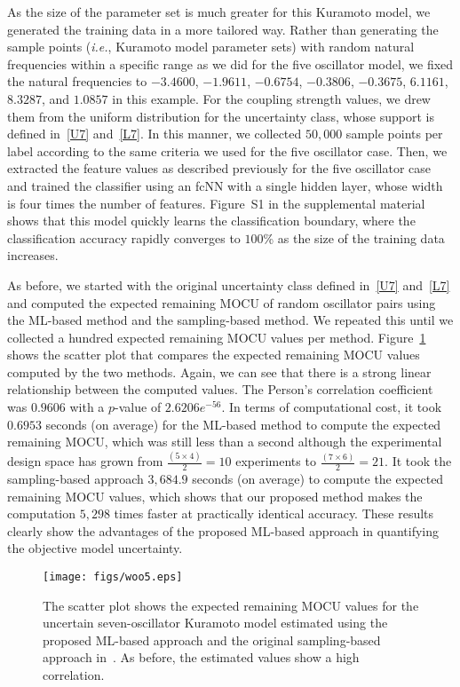 \documentclass{article}
\begin{document}
As the size of the parameter set is much greater for this Kuramoto model, we generated the training data in a more tailored way. Rather than generating the sample points (\textit{i.e.}, Kuramoto model parameter sets) with random natural frequencies within a specific range as we did for the five oscillator model, we fixed the natural frequencies to $-3.4600$, $-1.9611$, $-0.6754$, $-0.3806$, $-0.3675$, $6.1161$, $8.3287$, and ${1.0857}$ in this example. For the coupling strength values, we drew them from the uniform distribution for the uncertainty class, whose support is defined in~\eqref{U7} and~\eqref{L7}. In this manner, we collected $50,000$ sample points per label according to the same criteria we used for the five oscillator case. Then, we extracted the feature values as described previously for the five oscillator case and trained the classifier using an fcNN with a single hidden layer, whose width is four times the number of features. Figure~S1 in the supplemental material shows that this model quickly learns the classification boundary, where the classification accuracy rapidly converges to $100$\% as the size of the training data increases.

As before, we started with the original uncertainty class defined in~\eqref{U7} and~\eqref{L7} and computed the expected remaining MOCU of random oscillator pairs using the ML-based method and the sampling-based method. We repeated this until we collected a hundred expected remaining MOCU values per method. Figure~\ref{fig5} shows the scatter plot that compares the expected remaining MOCU values computed by the two methods. Again, we can see that there is a strong linear relationship between the computed values. The Person's correlation coefficient was ${0.9606}$ with a ${p}$-value of ${2.6206e^{-56}}$. In terms of computational cost, it took ${0.6953}$ seconds (on average) for the ML-based method to compute the expected remaining MOCU, which was still less than a second although the experimental design space has grown from ${\frac{\left(5\times4\right)}{2} = 10}$ experiments to ${\frac{\left(7\times6\right)}{2} = 21}$. It took the sampling-based approach  ${3,684.9}$ seconds (on average) to compute the expected remaining MOCU values, which shows that our proposed method makes the computation $5,298$ times faster at practically identical accuracy. These results clearly show the advantages of the proposed ML-based approach in quantifying the objective model uncertainty.
\begin{figure}
\centering
\texttt{[image: figs/woo5.eps]}
\caption{The scatter plot shows the expected remaining MOCU values for the uncertain seven-oscillator Kuramoto model estimated using the proposed ML-based approach and the original sampling-based approach in~\cite{Hong2021}. As before, the estimated values show a high correlation.}
\label{fig5}
\end{figure}
\end{document}
